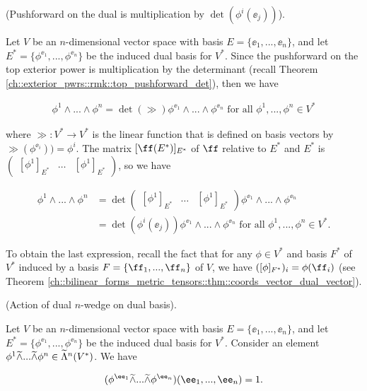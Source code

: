 \begin{lemma}
\label{ch::exterior_pwrs::lemma::pushforward_on_dual}

    (Pushforward on the dual is multiplication by $\det(\phi^i(\ee_j))$).
    
    Let $V$ be an $n$-dimensional vector space with basis $E = \{\ee_1, ..., \ee_n\}$, and let $E^* = \{\phi^{\ee_1}, ..., \phi^{\ee_n}\}$ be the induced dual basis for $V^*$. Since the pushforward on the top exterior power is multiplication by the determinant (recall Theorem \ref{ch::exterior_pwrs::rmk::top_pushforward_det}), then we have
    
    \begin{align*}
        \phi^1 \wedge ... \wedge \phi^n = \det(\gg) \phi^{\ee_1} \wedge ... \wedge \phi^{\ee_n}
        \text{ for all  $\phi^1, ..., \phi^n \in V^*$}
    \end{align*}

    where $\gg:V^* \rightarrow V^*$ is the linear function that is defined on basis vectors by $\gg(\phi^{\ee_i})) = \phi^i$. The matrix $[\ff(E^*)]_{E^*}$ of $\ff$ relative to $E^*$ and $E^*$ is $\begin{pmatrix} [\phi^1]_{E^*} & \hdots & [\phi^1]_{E^*} \end{pmatrix}$, so we have
    
    \begin{align*}
        \phi^1 \wedge ... \wedge \phi^n &= \det \begin{pmatrix} [\phi^1]_{E^*} & \hdots & [\phi^1]_{E^*} \end{pmatrix} \phi^{\ee_1} \wedge ... \wedge \phi^{\ee_n} \\
        &= \det(\phi^i(\ee_j)) \phi^{\ee_1} \wedge ... \wedge \phi^{\ee_n} \text{ for all $\phi^1, ..., \phi^n \in V^*$}.
    \end{align*}
    
    To obtain the last expression, recall the fact that for any $\phi \in V^*$ and basis $F^*$ of $V^*$ induced by a basis $F = \{\ff_1, ..., \ff_n\}$ of $V$, we have $([\phi]_{F^*})_i = \phi(\ff_i)$ (see Theorem \ref{ch::bilinear_forms_metric_tensors::thm::coords_vector_dual_vector}).
\end{lemma}

\begin{lemma}
\label{ch::exterior_pwrs::lemma::action_dual_wedge_dual_basis}
    (Action of dual $n$-wedge on dual basis).
    
    Let $V$ be an $n$-dimensional vector space with basis $E = \{\ee_1, ..., \ee_n\}$, and let $E^* = \{\phi^{\ee_1}, ..., \phi^{\ee_n}\}$ be the induced dual basis for $V^*$. Consider an element $\phi^1 \widetilde{\wedge} ... \widetilde{\wedge} \phi^n \in \widetilde{\Lambda}^n(V^*)$. We have
    
    \begin{align*}
        (\phi^{\ee_1} \twedge ... \twedge \phi^{\ee_n})(\ee_1, ..., \ee_n) = 1.
    \end{align*} 
\end{lemma}

